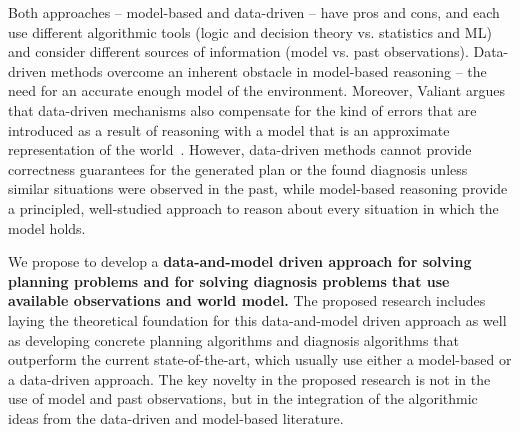 \documentclass[12pt]{article}
\begin{document}
Both approaches -- model-based and data-driven --  have pros and cons, and each use different algorithmic tools (logic and decision theory vs. statistics and ML) and consider different sources of information (model vs. past observations). Data-driven methods overcome an inherent obstacle in model-based reasoning -- the need for an accurate enough model of the environment. Moreover, Valiant argues that  data-driven mechanisms also compensate for the kind of errors that are introduced as a result of  reasoning with a model that is an approximate representation of the world~\cite{valiant2000neuroidal,valiant2000robustLogics}.
However, data-driven methods cannot provide correctness guarantees for the generated plan or the found diagnosis unless similar situations were observed in the past, 
while model-based reasoning provide a principled,  well-studied approach to reason about every situation in which the model holds. %


We propose to develop a {\bf data-and-model driven approach for solving planning problems and for solving diagnosis problems that use available observations and world model.} 
The proposed research includes laying the theoretical foundation for this data-and-model driven approach as well as developing concrete planning algorithms and diagnosis algorithms that outperform the current state-of-the-art, which usually use either a model-based or a data-driven approach. 
The key novelty in the proposed research is not in the use of model and past observations, but in 
 the integration of the algorithmic ideas from the data-driven and model-based literature. 
\end{document}

